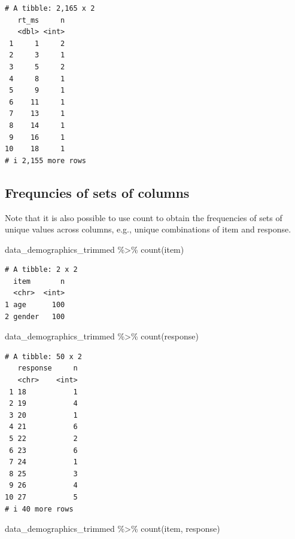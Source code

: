 \documentclass[
  letterpaper,
  DIV=11,
  numbers=noendperiod]{scrreprt}
\newenvironment{Shaded}{\begin{snugshade}}{\end{snugshade}}
\newcommand{\FunctionTok}[1]{\textcolor[rgb]{0.28,0.35,0.67}{#1}}
\newcommand{\NormalTok}[1]{\textcolor[rgb]{0.00,0.23,0.31}{#1}}
\newcommand{\SpecialCharTok}[1]{\textcolor[rgb]{0.37,0.37,0.37}{#1}}
\begin{document}
\begin{verbatim}
# A tibble: 2,165 x 2
   rt_ms     n
   <dbl> <int>
 1     1     2
 2     3     1
 3     5     2
 4     8     1
 5     9     1
 6    11     1
 7    13     1
 8    14     1
 9    16     1
10    18     1
# i 2,155 more rows
\end{verbatim}

\subsection{Frequncies of sets of
columns}\label{frequncies-of-sets-of-columns}

Note that it is also possible to use count to obtain the frequencies of
sets of unique values across columns, e.g., unique combinations of item
and response.

\begin{Shaded}
\begin{Highlighting}[]
\NormalTok{data\_demographics\_trimmed }\SpecialCharTok{\%\textgreater{}\%}
  \FunctionTok{count}\NormalTok{(item)}
\end{Highlighting}
\end{Shaded}

\begin{verbatim}
# A tibble: 2 x 2
  item       n
  <chr>  <int>
1 age      100
2 gender   100
\end{verbatim}

\begin{Shaded}
\begin{Highlighting}[]
\NormalTok{data\_demographics\_trimmed }\SpecialCharTok{\%\textgreater{}\%}
  \FunctionTok{count}\NormalTok{(response)}
\end{Highlighting}
\end{Shaded}

\begin{verbatim}
# A tibble: 50 x 2
   response     n
   <chr>    <int>
 1 18           1
 2 19           4
 3 20           1
 4 21           6
 5 22           2
 6 23           6
 7 24           1
 8 25           3
 9 26           4
10 27           5
# i 40 more rows
\end{verbatim}

\begin{Shaded}
\begin{Highlighting}[]
\NormalTok{data\_demographics\_trimmed }\SpecialCharTok{\%\textgreater{}\%}
  \FunctionTok{count}\NormalTok{(item, response)}
\end{Highlighting}
\end{Shaded}
\end{document}
